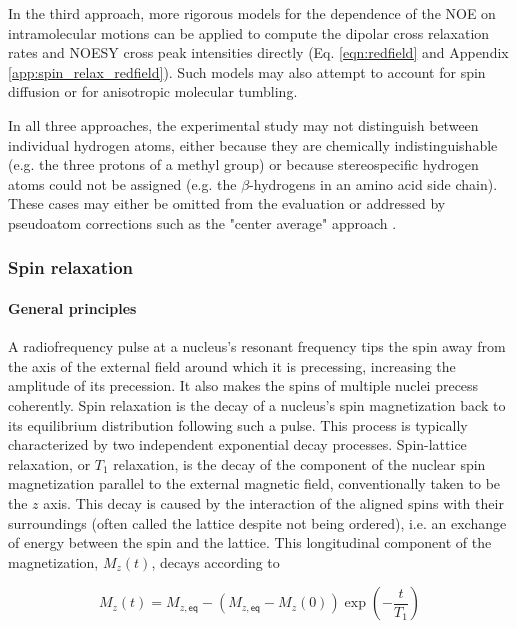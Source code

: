 \documentclass[9pt,review]{livecoms}
\begin{document}
In the third approach, more rigorous models for the dependence of the NOE on intramolecular motions \cite{peter_calculation_2001,vogeli_nuclear_2014} can be applied to compute the dipolar cross relaxation rates and NOESY cross peak intensities directly (Eq. \ref{eqn:redfield} and Appendix \ref{app:spin_relax_redfield}).
Such models may also attempt to account for spin diffusion or for anisotropic molecular tumbling.

In all three approaches, the experimental study may not distinguish between individual hydrogen atoms, either because they are chemically indistinguishable (e.g. the three protons of a methyl group) or because stereospecific hydrogen atoms could not be assigned (e.g. the $\beta$-hydrogens in an amino acid side chain).
These cases may either be omitted from the evaluation or addressed by pseudoatom corrections such as the "center average" approach \cite{wuthrich_pseudo-structures_1983,fletcher_treatment_1996}.

\subsubsection{Spin relaxation}
\label{sub2:spin_relax}

\paragraph{General principles}

A radiofrequency pulse at a nucleus’s resonant frequency tips the spin away from the axis of the external field around which it is precessing, increasing the amplitude of its precession.
It also makes the spins of multiple nuclei precess coherently.
Spin relaxation is the decay of a nucleus’s spin magnetization back to its equilibrium distribution following such a pulse.
This process is typically characterized by two independent exponential decay processes.
Spin-lattice relaxation, or $T_1$ relaxation, is the decay of the component of the nuclear spin magnetization parallel to the external magnetic field, conventionally taken to be the $z$ axis.
This decay is caused by the interaction of the aligned spins with their surroundings (often called the lattice despite not being ordered), i.e. an exchange of energy between the spin and the lattice.
This longitudinal component of the magnetization, $M_z(t)$, decays according to

\begin{equation}
\label{eqn:t1_relax}
M_z(t) = M_{z,\mathsf{eq}} - (M_{z,\mathsf{eq}} - M_z(0)) \exp(-\frac {t} {T_1})
\end{equation}
\end{document}
